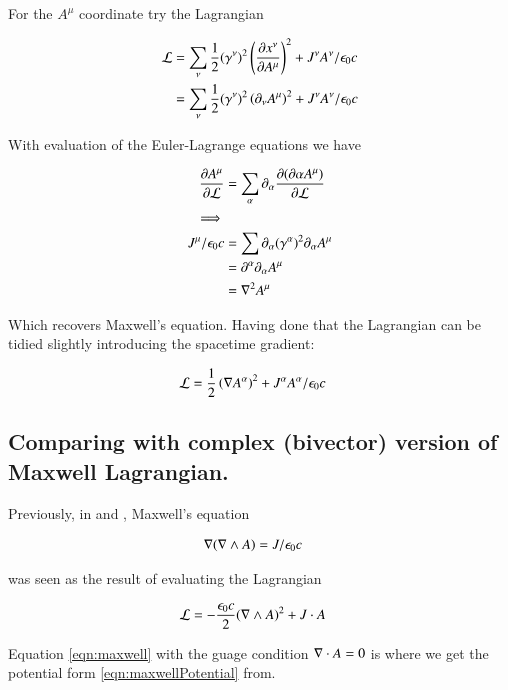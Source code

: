 \documentclass{article}
\begin{document}
For the $A^\mu$ coordinate try the Lagrangian

\begin{align*}
\mathcal{L} 
&= \sum_\nu \frac{1}{2} (\gamma^\nu)^2 \left( \frac{\partial{x^\nu}}{\partial {A^\mu}} \right)^2 + J^\nu A^\nu / \epsilon_0 c \\
&= \sum_\nu \frac{1}{2} (\gamma^\nu)^2 \left(\partial_{\nu}{A^\mu}\right)^2 + J^\nu A^\nu / \epsilon_0 c \\
\end{align*}

With evaluation of the Euler-Lagrange equations we have

\begin{align*}
\frac{\partial{A^\mu}}{\partial {\mathcal{L}}} &= \sum_\alpha \partial_{\alpha} \frac{\partial{(\partial{\alpha}{A^\mu})}}{\partial {\mathcal{L}}} \\
\implies \\
J^\mu/\epsilon_0 c
&= \sum \partial_\alpha (\gamma^\alpha)^2 \partial_{\alpha}{A^\mu} \\
&= \partial^\alpha \partial_{\alpha}{A^\mu} \\
&= \nabla^2 A^\mu \\
\end{align*}

Which recovers Maxwell's equation.  Having done that the Lagrangian can be tidied slightly introducing the spacetime gradient:

\begin{align}\label{eqn:potentialLagrangianWithGrad}
\mathcal{L} &= \frac{1}{2} \left( \nabla {A^\alpha} \right)^2 + J^\alpha A^\alpha / \epsilon_0 c
\end{align}

\subsection{ Comparing with complex (bivector) version of Maxwell Lagrangian. }
Previously, in \cite{PJMaxwellLagrangian} and \cite{PJFieldLagrangian}, Maxwell's equation 

\begin{align}\label{eqn:maxwell}
\nabla (\nabla \wedge A) &= J/ \epsilon_0 c
\end{align}

was seen as the result of evaluating the Lagrangian

\begin{align}\label{eqn:maxlag}
\mathcal{L} &= -\frac{\epsilon_0 c}{2} (\nabla \wedge A)^2 + J \cdot A
\end{align}

Equation \ref{eqn:maxwell} with the guage condition $\nabla \cdot A = 0$
is where we get the potential form \ref{eqn:maxwellPotential} from.
\end{document}
